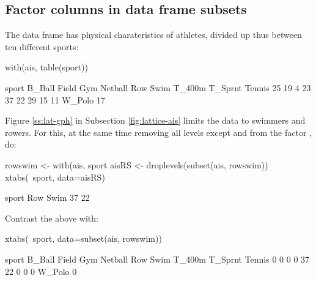 \subsection{Factor columns in data frame subsets}

The data frame  has physical charateristics
of athletes, divided up thus between ten different sports:
\begin{fullwidth}
\begin{minipage}[t]{\linewidth}

\begin{Schunk}
\begin{Sinput}
with(ais, table(sport))
\end{Sinput}
\begin{Soutput}
sport
 B_Ball   Field     Gym Netball     Row    Swim  T_400m T_Sprnt  Tennis 
     25      19       4      23      37      22      29      15      11 
 W_Polo 
     17 
\end{Soutput}
\end{Schunk}

\end{minipage}
\end{fullwidth}

Figure \ref{ss:lat-gph} in Subsection \ref{fig:lattice-ais} limits the
data to swimmers and rowers. For this, at the same time removing all
levels except  and  from the factor ,
do:
\begin{Schunk}
\begin{Sinput}
rowswim <- with(ais, sport %
aisRS <- droplevels(subset(ais, rowswim))
xtabs(~sport, data=aisRS)
\end{Sinput}
\begin{Soutput}
sport
 Row Swim 
  37   22 
\end{Soutput}
\end{Schunk}
Contrast the above with:
\begin{fullwidth}

\begin{Schunk}
\begin{Sinput}
xtabs(~sport, data=subset(ais, rowswim))
\end{Sinput}
\begin{Soutput}
sport
 B_Ball   Field     Gym Netball     Row    Swim  T_400m T_Sprnt  Tennis 
      0       0       0       0      37      22       0       0       0 
 W_Polo 
      0 
\end{Soutput}
\end{Schunk}

\end{fullwidth}

